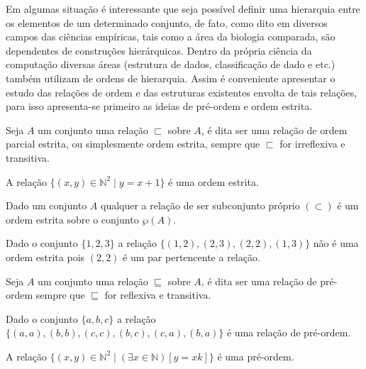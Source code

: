 Em algumas situação é interessante que seja possível definir uma hierarquia entre os elementos de um determinado conjunto, de fato, como dito em \cite{abe1991-TC} diversos campos das ciências empíricas, tais como a área da biologia comparada, são dependentes de construções hierárquicas. Dentro da própria ciência da computação diversas áreas (estrutura de dados, classificação de dado e etc.) também utilizam de ordens de hierarquia. Assim é conveniente apresentar o estudo das relações de ordem e das estruturas existentes envolta de tais relações, para isso apresenta-se primeiro as ideias de pré-ordem e ordem estrita.

\begin{definition}\label{def:OrdemParcialEstrita}
	Seja $A$ um conjunto uma relação $\sqsubset$ sobre $A$, é dita ser uma relação de ordem parcial estrita, ou simplesmente ordem estrita, sempre que $\sqsubset$ for irreflexiva e transitiva.
\end{definition}

\begin{example}
	A relação $\{(x, y) \in \mathbb{N}^2 \mid y = x + 1\}$ é uma ordem estrita.
\end{example}

\begin{example}
	Dado um conjunto $A$ qualquer a relação de ser subconjunto próprio $(\subset)$ é um ordem estrita sobre o conjunto $\wp(A)$.
\end{example}

\begin{example}
	Dado o conjunto $\{1, 2, 3\}$ a relação $\{(1, 2), (2, 3), (2, 2), (1, 3)\}$ não é uma ordem estrita pois $(2, 2)$ é um par pertencente a relação.
\end{example}

\begin{definition}
	Seja $A$ um conjunto uma relação $\sqsubseteq$ sobre $A$, é dita ser uma relação de pré-ordem sempre que $\sqsubseteq$ for reflexiva e transitiva.
\end{definition}

\begin{example}
	Dado o conjunto $\{a, b, c\}$ a relação $\{(a, a), (b, b), (c, c), (b, c), (c, a), (b, a)\}$ é uma relação de pré-ordem.
\end{example}

\begin{example}
	A relação $\{(x, y) \in \mathbb{N}^2 \mid (\exists x \in \mathbb{N})[y = xk]\}$ é uma pré-ordem.
\end{example}

